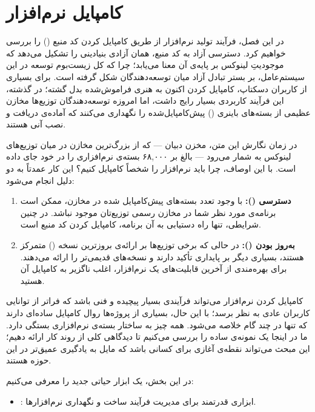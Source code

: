 \chapter{کامپایل نرم‌افزار}

در این فصل، فرآیند تولید نرم‌افزار از طریق کامپایل کردن کد منبع () را بررسی خواهیم کرد. دسترسی آزاد به کد منبع، همان آزادی بنیادینی را تشکیل می‌دهد که موجودیتِ لینوکس بر پایه‌ی آن معنا می‌یابد؛ چرا که کل زیست‌بوم توسعه در این سیستم‌عامل، بر بستر تبادل آزاد میان توسعه‌دهندگان شکل گرفته است. برای بسیاری از کاربران دسکتاپ، کامپایل کردن اکنون به هنری فراموش‌شده بدل گشته؛ در گذشته، این فرآیند کاربردی بسیار رایج داشت، اما امروزه توسعه‌دهندگان توزیع‌ها مخازن عظیمی از بسته‌های باینری () پیش‌کامپایل‌شده را نگهداری می‌کنند که آماده‌ی دریافت و نصب آنی هستند.

در زمان نگارش این متن، مخزن دبیان — که از بزرگ‌ترین مخازن در میان توزیع‌های لینوکس به شمار می‌رود — بالغ بر ۶۸,۰۰۰ بسته‌ی نرم‌افزاری را در خود جای داده است. با این اوصاف، چرا باید نرم‌افزار را شخصاً کامپایل کنیم؟ این کار عمدتاً به دو دلیل انجام می‌شود:

\begin{enumerate}
  \item \textbf{دسترسی ():} با وجود تعدد بسته‌های پیش‌کامپایل شده در مخازن، ممکن است برنامه‌ی مورد نظر شما در مخازن رسمی توزیع‌تان موجود نباشد. در چنین شرایطی، تنها راه دستیابی به آن برنامه، کامپایل کردن کد منبع است.
  \item \textbf{به‌روز بودن ():} در حالی که برخی توزیع‌ها بر ارائه‌ی بروزترین نسخه () متمرکز هستند، بسیاری دیگر بر پایداری تأکید دارند و نسخه‌های قدیمی‌تر را ارائه می‌دهند. برای بهره‌مندی از آخرین قابلیت‌های یک نرم‌افزار، اغلب ناگزیر به کامپایل آن هستید.
\end{enumerate}

کامپایل کردن نرم‌افزار می‌تواند فرآیندی بسیار پیچیده و فنی باشد که فراتر از توانایی کاربران عادی به نظر برسد؛ با این حال، بسیاری از پروژه‌ها روال کامپایل ساده‌ای دارند که تنها در چند گام خلاصه می‌شود. همه چیز به ساختار بسته‌ی نرم‌افزاری بستگی دارد. ما در اینجا یک نمونه‌ی ساده را بررسی می‌کنیم تا دیدگاهی کلی از روند کار ارائه دهیم؛ این مبحث می‌تواند نقطه‌ی آغازی برای کسانی باشد که مایل به یادگیری عمیق‌تر در این حوزه هستند.

در این بخش، یک ابزار حیاتی جدید را معرفی می‌کنیم:

\begin{itemize}
  \item {}: ابزاری قدرتمند برای مدیریت فرآیند ساخت و نگهداری نرم‌افزارها.
\end{itemize}

